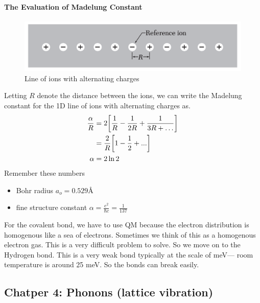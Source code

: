 \documentclass[../main.tex]{subfiles}
\begin{document}
\paragraph{The Evaluation of Madelung Constant}
\begin{figure}[ht]
    \centering
    \includegraphics[width=0.4\linewidth]{ionline.png}
    \caption{Line of ions with alternating charges}
    \label{fig:4.1}
\end{figure}
Letting $R$ denote the distance between the ions, we can write the Madelung constant for the 1D line
of ions with alternating charges as.
\begin{align*}
    \frac{\alpha}{R} &= 2\qt[
        \frac{1}{R} - \frac{1}{2R} + \frac{1}{3R + \dots}
    ] \\
    &= \frac{2}{R} \qt[1 - \frac{1}{2} +...] \\
    \alpha &= 2 \ln{2} 
\end{align*}
Remember these numbers
\begin{itemize}
    \item Bohr radius $a_o = 0.529 \unit{\angstrom}$
    \item fine structure constant $\alpha = \frac{e^2}{\hbar c} = \frac{1}{137}$
\end{itemize}
For the covalent bond, we have to use QM because the electron distribution is homogenous like
a sea of electrons. Sometimes we think of this as a homogenous electron gas. This is a very
difficult problem to solve. So we move on to the Hydrogen bond. This is a very weak bond typically
at the scale of meV--- room temperature is around 25 meV. So the bonds can break easily.

\pagebreak
\subsection*{Chatper 4: Phonons (lattice vibration)}
\end{document}
